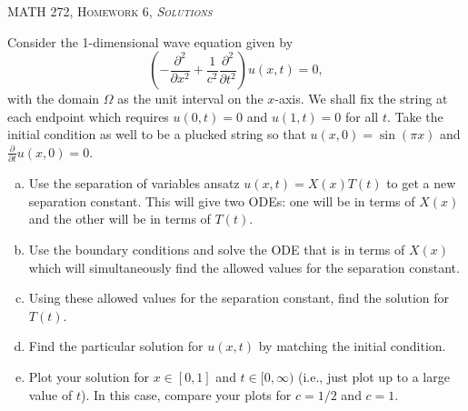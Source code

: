 \documentclass[12pt]{article} %
\begin{document}
\begin{center}
   \textsc{\large MATH 272, Homework 6, \emph{Solutions}}\\
\end{center}
\vspace{.5cm}

\begin{problem}
    Consider the 1-dimensional wave equation given by
    \[
    \left( - \frac{\partial^2}{\partial x^2} +\frac{1}{c^2} \frac{\partial^2}{\partial t^2} \right) u(x,t) =0,
    \]
    with the domain $\Omega$ as the unit interval on the $x$-axis.  We shall fix the string at each endpoint which requires $u(0,t)=0$ and $u(1,t)=0$ for all $t$.  Take the initial condition as well to be a plucked string so that $u(x,0)=\sin(\pi x)$ and $\frac{\partial}{\partial t}u(x,0)=0$. 
    \begin{enumerate}[(a)]
        \item Use the separation of variables ansatz $u(x,t)=X(x)T(t)$ to get a new separation constant. This will give two ODEs: one will be in terms of $X(x)$ and the other will be in terms of $T(t)$.
        \item Use the boundary conditions and solve the ODE that is in terms of $X(x)$ which will simultaneously find the allowed values for the separation constant.
        \item Using these allowed values for the separation constant, find the solution for $T(t)$.
        \item Find the particular solution for $u(x,t)$ by matching the initial condition.
        \item Plot your solution for $x\in [0,1]$ and $t\in [0,\infty)$ (i.e., just plot up to a large value of $t$). In this case, compare your plots for $c=1/2$ and $c=1$.
    \end{enumerate}
\end{problem}
\end{document}
